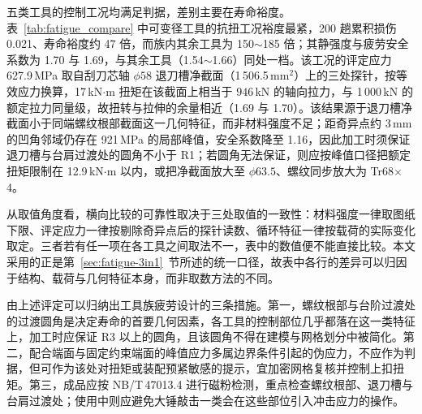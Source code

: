 五类工具的控制工况均满足判据，差别主要在寿命裕度。表~\ref{tab:fatigue_compare} 中可变径工具的抗扭工况裕度最紧，200 趟累积损伤 0.021、寿命裕度约 47 倍，而族内其余工具为 150$\sim$185 倍；其静强度与疲劳安全系数为 1.70 与 1.69，与其余工具（1.54$\sim$1.66）同处一档。该工况的评定应力 627.9\,MPa 取自刮刀芯轴 $\phi58$ 退刀槽净截面（1\,506.5\,mm$^2$）上的三处探针，按等效应力换算，17\,kN$\cdot$m 扭矩在该截面上相当于 $946$\,kN 的轴向拉力，与 1\,000\,kN 的额定拉力同量级，故扭转与拉伸的余量相近（1.69 与 1.70）。该结果源于退刀槽净截面小于同端螺纹根部截面这一几何特征，而非材料强度不足；距奇异点约 3\,mm 的凹角邻域仍存在 921\,MPa 的局部峰值，安全系数降至 1.16，因此加工时须保证退刀槽与台肩过渡处的圆角不小于 R1；若圆角无法保证，则应按峰值口径把额定扭矩限制在 12.9\,kN$\cdot$m 以内，或把净截面放大至 $\phi63.5$、螺纹同步放大为 Tr68$\times$4。

从取值角度看，横向比较的可靠性取决于三处取值的一致性：材料强度一律取图纸下限、评定应力一律按剔除奇异点后的探针读数、循环特征一律按载荷的实际变化取定。三者若有任一项在各工具之间取法不一，表中的数值便不能直接比较。本文采用的正是第~\ref{sec:fatigue-3in1}~节所述的统一口径，故表中各行的差异可以归因于结构、载荷与几何特征本身，而非取数方法的不同。

由上述评定可以归纳出工具族疲劳设计的三条措施。第一，螺纹根部与台阶过渡处的过渡圆角是决定寿命的首要几何因素，各工具的控制部位几乎都落在这一类特征上，加工时应保证 R3 以上的圆角，且该圆角不得在建模与网格划分中被简化。第二，配合端面与固定约束端面的峰值应力多属边界条件引起的伪应力，不应作为判据，但可作为该处对扭矩或装配预紧敏感的提示，宜加密网格复核并控制上扣扭矩。第三，成品应按 NB/T\,47013.4 进行磁粉检测，重点检查螺纹根部、退刀槽与台肩过渡处；使用中则应避免大锤敲击一类会在这些部位引入冲击应力的操作。
